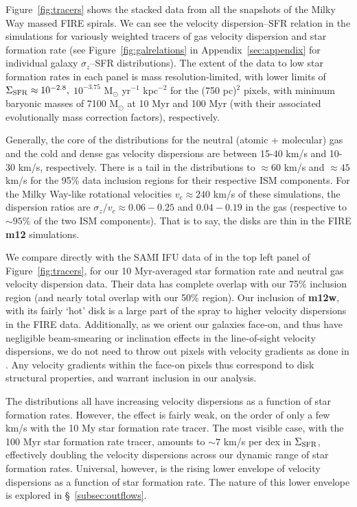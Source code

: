 \documentclass[usletter,fleqn,usenatbib]{mnras}
\begin{document}
Figure~\ref{fig:tracers} shows the stacked data from all the snapshots of the Milky Way massed FIRE spirals. We can see the velocity dispersion--SFR relation in the simulations for variously weighted tracers of gas velocity dispersion and star formation rate (see Figure~\ref{fig:galrelations} in Appendix~\ref{sec:appendix} for individual galaxy $\sigma_z$--SFR distributions).  The extent of the data to low star formation rates in each panel is mass resolution-limited, with lower limits of $\Sigma_{\rm SFR} \approx 10^{-2.8},$ $10^{-3.75}$ M$_\odot$ yr$^{-1}$ kpc$^{-2}$ for the (750 pc)$^2$ pixels, with minimum baryonic masses of 7100 M$_\odot$ at 10 Myr and 100 Myr (with their associated evolutionally mass correction factors), respectively. 

Generally, the core of the distributions for the neutral (atomic + molecular) gas and the cold and dense gas velocity dispersions are between 15-40 km/s and 10-30 km/s, respectively.   There is a tail in the distributions to $\approx 60$ km/s and $\approx 45$ km/s for the 95\% data inclusion regions for their respective ISM components.  For the Milky Way-like rotational velocities $v_c \approx 240$ km/s of these simulations, the dispersion ratios are $\sigma_z/v_c \approx 0.06-0.25$ and $0.04-0.19$ in the gas (respective to $\sim 95\%$ of the two ISM components).  That is to say, the disks are thin in the FIRE \textbf{m12} simulations.

We compare directly with the SAMI IFU data of \citet{Zhou2017} in the top left panel of Figure~\ref{fig:tracers}, for our 10 Myr-averaged star formation rate and neutral gas velocity dispersion data.  Their data has complete overlap with our 75\% inclusion region (and nearly total overlap with our 50\% region).  Our inclusion of \textbf{m12w}, with its fairly `hot' disk is a large part of the spray to higher velocity dispersions in the FIRE data.  Additionally, as we orient our galaxies face-on, and thus have negligible beam-smearing or inclination effects in the line-of-sight velocity dispersions, we do not need to throw out pixels with velocity gradients as done in \citet{Zhou2017}.  Any velocity gradients within the face-on pixels thus correspond to disk structural properties, and warrant inclusion in our analysis.

The distributions all have increasing velocity dispersions as a function of star formation rates.  However, the effect is fairly weak, on the order of only a few km/s with the 10 My star formation rate tracer.   The most visible case, with the 100 Myr star formation rate tracer, amounts to $\sim 7$ km/s per dex in $\Sigma_{\rm SFR}$, effectively doubling the velocity dispersions across our dynamic range of star formation rates.  Universal, however, is the rising lower envelope of velocity dispersions as a function of star formation rate.  The nature of this lower envelope is explored in \S~\ref{subsec:outflows}.
\end{document}
